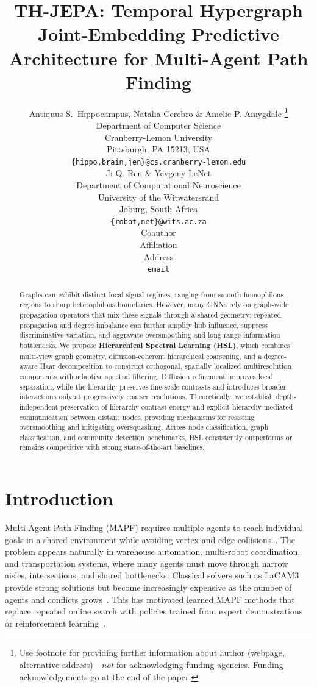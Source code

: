 \documentclass{article} %
\title{TH-JEPA: Temporal Hypergraph Joint-Embedding Predictive Architecture for Multi-Agent Path Finding}
\author{Antiquus S.~Hippocampus, Natalia Cerebro \& Amelie P. Amygdale \thanks{ Use footnote for providing further information
about author (webpage, alternative address)---\emph{not} for acknowledging
funding agencies.  Funding acknowledgements go at the end of the paper.} \\
Department of Computer Science\\
Cranberry-Lemon University\\
Pittsburgh, PA 15213, USA \\
\texttt{\{hippo,brain,jen\}@cs.cranberry-lemon.edu} \\
\And
Ji Q. Ren \& Yevgeny LeNet \\
Department of Computational Neuroscience \\
University of the Witwatersrand \\
Joburg, South Africa \\
\texttt{\{robot,net\}@wits.ac.za} \\
\AND
Coauthor \\
Affiliation \\
Address \\
\texttt{email}
}
\begin{document}
\maketitle

\begin{abstract}
Graphs can exhibit distinct local signal regimes, ranging from smooth
homophilous regions to sharp heterophilous boundaries. However, many GNNs rely on graph-wide propagation operators that mix these signals through a shared geometry; repeated propagation and degree imbalance can further amplify hub influence, suppress discriminative variation, and aggravate oversmoothing and long-range information bottlenecks. We propose \textbf{Hierarchical Spectral Learning (HSL)}, which combines multi-view graph geometry, diffusion-coherent hierarchical coarsening, and a degree-aware Haar decomposition to construct orthogonal, spatially localized multiresolution components with adaptive spectral filtering. Diffusion refinement improves local separation, while the hierarchy preserves fine-scale contrasts and introduces broader interactions only at progressively coarser resolutions. Theoretically, we establish depth-independent preservation of hierarchy contrast energy and explicit hierarchy-mediated communication between distant nodes, providing mechanisms for resisting oversmoothing and mitigating oversquashing. Across node classification, graph classification, and community detection benchmarks, HSL consistently outperforms or remains competitive with strong state-of-the-art baselines.


\end{abstract}
% 
%
%




\section{Introduction}
\label{sec:introduction}

Multi-Agent Path Finding (MAPF) requires multiple agents to reach individual goals in a shared environment while avoiding vertex and edge collisions~\cite{stern2019mapf}. The problem appears naturally in warehouse automation, multi-robot coordination, and transportation systems, where many agents must move through narrow aisles, intersections, and shared bottlenecks. Classical solvers such as LaCAM3 provide strong solutions but become increasingly expensive as the number of agents and conflicts grows~\cite{okumura2024lacam3}. This has motivated learned MAPF methods that replace repeated online search with policies trained from expert demonstrations or reinforcement learning~\cite{li2021magat,andreychuk2025mapf}.
\end{document}
